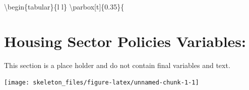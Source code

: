 \documentclass[]{article}
\begin{document}
\newpage

\textbackslash{}begin\{tabular\}\{l l\}
\textbackslash{}parbox{[}t{]}\{0.35\textwidth\}\{
\color{ultramarineblue} \section{Housing Sector Policies Variables:}

\small
\color{black} This section is a place holder and do not contain final
variables and text.

\lipsum[2-2]
\bigskip

\begin{center}\texttt{[image: skeleton\_files/figure-latex/unnamed-chunk-1-1]} \end{center}
\end{document}
